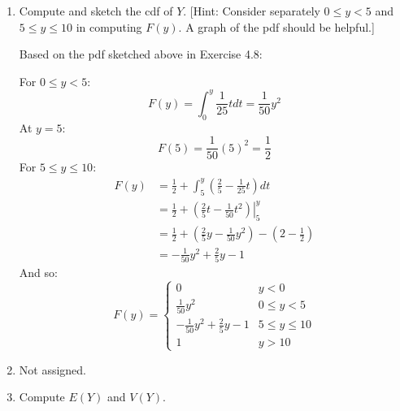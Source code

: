 \documentclass[letterpaper,12pt,fleqn]{article}
\begin{document}
\begin{enumerate}[label={\alph*)}]
\item Compute and sketch the cdf of \(Y\). [Hint: Consider separately \(0\le y<5\) and \(5\le y\le10\) in computing
  \(F(y)\).  A graph of the pdf should be helpful.]

  Based on the pdf sketched above in Exercise 4.8:

  For \(0\le y<5\):
  \[F(y)=\int_0^y\frac{1}{25}tdt=\frac{1}{50}y^2\]
  At \(y=5\):
  \[F(5)=\frac{1}{50}(5)^2=\frac{1}{2}\]
  For \(5\le y\le10\):
  \begin{align*}
    F(y) & =\frac{1}{2}+\int_5^y\left(\frac{2}{5}-\frac{1}{25}t\right)dt \\
    &= \frac{1}{2}+\left.\left(\frac{2}{5}t-\frac{1}{50}t^2\right)\right|_5^y \\
    &= \frac{1}{2}+\left(\frac{2}{5}y-\frac{1}{50}y^2\right)-\left(2-\frac{1}{2}\right) \\
    &= -\frac{1}{50}y^2+\frac{2}{5}y-1
  \end{align*}
  And so:
  \[F(y)=\begin{cases}
  0 & y<0 \\
  \frac{1}{50}y^2 & 0\le y<5 \\
  -\frac{1}{50}y^2+\frac{2}{5}y-1 & 5\le y\le10 \\
  1 & y>10
  \end{cases}\]

\item Not assigned.

\item Compute \(E(Y)\) and \(V(Y)\).


\end{enumerate}
\end{document}
